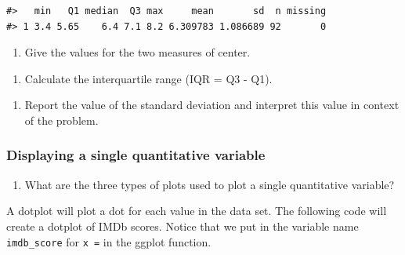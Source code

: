 \documentclass[
]{report}
\providecommand{\tightlist}{%
  \setlength{\itemsep}{0pt}\setlength{\parskip}{0pt}}
\begin{document}
\begin{verbatim}
#>   min   Q1 median  Q3 max     mean       sd  n missing
#> 1 3.4 5.65    6.4 7.1 8.2 6.309783 1.086689 92       0
\end{verbatim}

\begin{enumerate}
\def\labelenumi{\arabic{enumi}.}
\setcounter{enumi}{3}
\tightlist
\item
  Give the values for the two measures of center.
\end{enumerate}

\vspace{0.5in}

\begin{enumerate}
\def\labelenumi{\arabic{enumi}.}
\setcounter{enumi}{4}
\tightlist
\item
  Calculate the interquartile range (IQR = Q3 - Q1).
\end{enumerate}

\vspace{0.5in}

\begin{enumerate}
\def\labelenumi{\arabic{enumi}.}
\setcounter{enumi}{5}
\tightlist
\item
  Report the value of the standard deviation and interpret this value in context of the problem.
  \vspace{0.8in}
\end{enumerate}

\hypertarget{displaying-a-single-quantitative-variable}{%
\subsubsection*{Displaying a single quantitative variable}\label{displaying-a-single-quantitative-variable}}

\begin{enumerate}
\def\labelenumi{\arabic{enumi}.}
\setcounter{enumi}{6}
\tightlist
\item
  What are the three types of plots used to plot a single quantitative variable?
\end{enumerate}

\newpage

A dotplot will plot a dot for each value in the data set. The following code will create a dotplot of IMDb scores. Notice that we put in the variable name \texttt{imdb\_score} for \texttt{x\ =} in the ggplot function.
\end{document}
